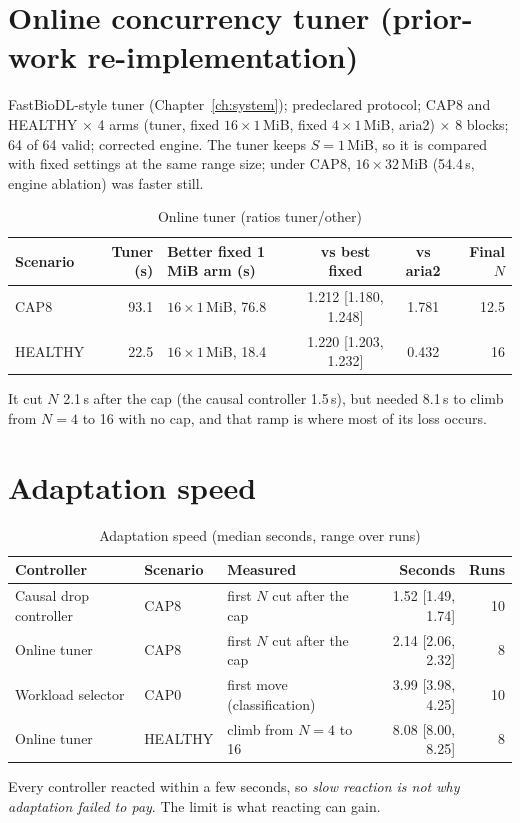 \section{Online concurrency tuner (prior-work re-implementation)}
FastBioDL-style tuner (Chapter~\ref{ch:system}); predeclared protocol; CAP8 and HEALTHY $\times$ 4 arms (tuner, fixed $16\times1$\,MiB, fixed $4\times1$\,MiB, aria2) $\times$ 8 blocks; 64 of 64 valid; corrected engine. The tuner keeps $S=1$\,MiB, so it is compared with fixed settings at the same range size; under CAP8, $16\times32$\,MiB (54.4\,s, engine ablation) was faster still.
\begin{table}[H]\centering\small
\caption{Online tuner (ratios tuner/other)}\label{tab:tuner}
\begin{tabular}{@{}lrlccr@{}}
\toprule
\textbf{Scenario} & \textbf{Tuner (s)} & \textbf{Better fixed 1\,MiB arm (s)} & \textbf{vs best fixed} & \textbf{vs aria2} & \textbf{Final $N$}\\
\midrule
CAP8 & 93.1 & $16\times1$\,MiB, 76.8 & 1.212 [1.180, 1.248] & 1.781 & 12.5\\
HEALTHY & 22.5 & $16\times1$\,MiB, 18.4 & 1.220 [1.203, 1.232] & 0.432 & 16\\
\bottomrule
\end{tabular}
\end{table}
It cut $N$ 2.1\,s after the cap (the causal controller 1.5\,s), but needed 8.1\,s to climb from $N=4$ to 16 with no cap, and that ramp is where most of its loss occurs.

\section{Adaptation speed}
\begin{table}[H]\centering\small
\caption{Adaptation speed (median seconds, range over runs)}\label{tab:adapt}
\begin{tabularx}{\linewidth}{@{}llLrr@{}}
\toprule
\textbf{Controller} & \textbf{Scenario} & \textbf{Measured} & \textbf{Seconds} & \textbf{Runs}\\
\midrule
Causal drop controller & CAP8 & first $N$ cut after the cap & 1.52 [1.49, 1.74] & 10\\
Online tuner & CAP8 & first $N$ cut after the cap & 2.14 [2.06, 2.32] & 8\\
Workload selector & CAP0 & first move (classification) & 3.99 [3.98, 4.25] & 10\\
Online tuner & HEALTHY & climb from $N=4$ to 16 & 8.08 [8.00, 8.25] & 8\\
\bottomrule
\end{tabularx}
\end{table}
Every controller reacted within a few seconds, so \emph{slow reaction is not why adaptation failed to pay}. The limit is what reacting can gain.

